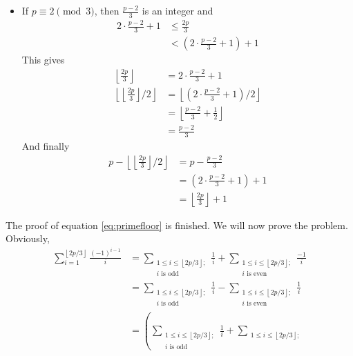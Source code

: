 \documentclass{subfile}
\begin{document}
\begin{solution}
\begin{itemize}
			\item If $p \equiv 2 \pmod 3$, then $\frac{p-2}{3}$ is an integer and
				\begin{align*}
					2\cdot\frac {p - 2}{3} + 1
						& \leq\frac {2p}{3}\\
						& < \left(2\cdot\frac {p - 2}{3} + 1\right) + 1
				\end{align*}
			This gives
				\begin{align*}
					\left\lfloor\frac {2p}{3}\right\rfloor
						&= 2\cdot\frac {p - 2}{3} + 1\\
					\left\lfloor\left\lfloor\frac {2p}{3}\right\rfloor /2\right\rfloor
						& =	\left\lfloor\left(2\cdot\frac {p - 2}{3} + 1\right)/2\right\rfloor\\
						& = \left\lfloor\frac {p - 2}{3} + \frac {1}{2}\right\rfloor\\
						& = \frac{p-2}{3}
				\end{align*}
			And finally
				\begin{align*}
					p - \left\lfloor\left\lfloor\frac {2p}{3}\right\rfloor /2\right\rfloor
						& = p - \frac {p - 2}{3}\\
						& = \left(2\cdot\frac {p - 2}{3} + 1\right) + 1\\
						& = \left\lfloor\frac {2p}{3}\right\rfloor + 1
				\end{align*}
		\end{itemize}
		The proof of equation \eqref{eq:primefloor} is finished. We will now prove the problem. Obviously,
			\begin{align*}
				\sum_{i = 1}^{\left\lfloor 2p/3\right\rfloor}\frac {\left( - 1\right)^{i - 1}}{i}
					&= \sum_{\substack{1\leq i\leq \left\lfloor 2p/3\right\rfloor ; \\
						i\text{ is odd}}}\frac {1}{i} + \sum_{\substack{1\leq i\leq \left\lfloor 2p/3\right\rfloor ; \\
						i\text{ is even}}}\frac { - 1}{i} \\
					&= \sum_{\substack{1\leq i\leq \left\lfloor 2p/3\right\rfloor ; \\
							i\text{ is odd}}}\frac {1}{i} - \sum_{\substack{1\leq i\leq \left\lfloor 2p/3\right\rfloor ; \\
							i\text{ is even}}}\frac {1}{i}\\
					&= \left(\sum_{\substack{1\leq i\leq \left\lfloor 2p/3\right\rfloor ; \\
							i\text{ is odd}}}\frac {1}{i} + \sum_{\substack{1\leq i\leq \left\lfloor 2p/3\right\rfloor ; \\
}}
\end{align*}
\end{solution}
\end{document}
